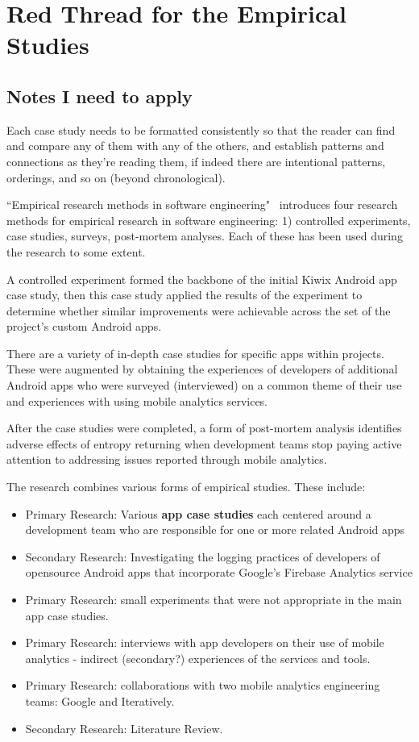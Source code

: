 \section{Red Thread for the Empirical Studies}
\label{section-empirical-studies-red-thread}

\subsection*{Notes I need to apply}
Each case study needs to be formatted consistently so that the reader can find and compare any of them with any of the others, and establish patterns and connections as they're reading them, if indeed there are intentional patterns, orderings, and so on (beyond chronological).

``Empirical research methods in software engineering"~\citep{Wohlin2003_empirical_research_methods_in_software_engineering} introduces four research methods for empirical research in software engineering: 1) controlled experiments, case studies, surveys, post-mortem analyses. Each of these has been used during the research to some extent.

A controlled experiment formed the backbone of the initial Kiwix Android app case study, then this case study applied the results of the experiment to determine whether similar improvements were achievable across the set of the project's custom Android apps. %

There are a variety of in-depth case studies for specific apps within projects. These were augmented by obtaining the experiences of developers of additional Android apps who were surveyed (interviewed) on a common theme of their use and experiences with using mobile analytics services. 

After the case studies were completed, a form of post-mortem analysis identifies adverse effects of entropy returning when development teams stop paying active attention to addressing issues reported through mobile analytics.


The research combines various forms of empirical studies. These include:
\begin{itemize}
    \itemsep0em
    \item Primary Research: Various \textbf{app case studies} each centered around a development team who are responsible for one or more related Android apps
    \item Secondary Research: Investigating the logging practices of developers of opensource Android apps that incorporate Google's Firebase Analytics service
    \item Primary Research: small experiments that were not appropriate in the main app case studies.
    \item Primary Research: interviews with app developers on their use of mobile analytics - indirect (secondary?) experiences of the services and tools.
    \item Primary Research: collaborations with two mobile analytics engineering teams: Google and Iteratively. 
    \item Secondary Research: Literature Review.
\end{itemize}

